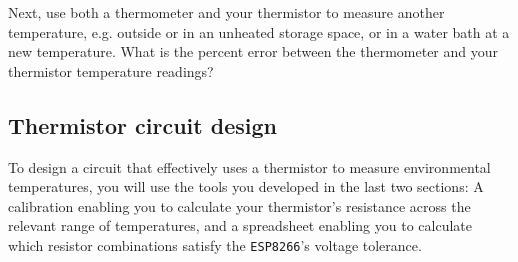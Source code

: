 \begin{enumerate}
	\smallskip
	Next, use both a thermometer and your thermistor to measure another temperature, e.g. outside or in an unheated storage space, or in a water bath at a new temperature. 
	What is the percent error between the thermometer and your thermistor temperature readings? 
	
\end{enumerate}



\subsection{Thermistor circuit design}
To design a circuit that effectively uses a thermistor to measure environmental temperatures, you will use the tools you developed in the last two sections: A calibration enabling you to calculate your thermistor's resistance across the relevant range of temperatures, and a spreadsheet enabling you to calculate which resistor combinations satisfy the \texttt{ESP8266}'s \adc voltage tolerance.

